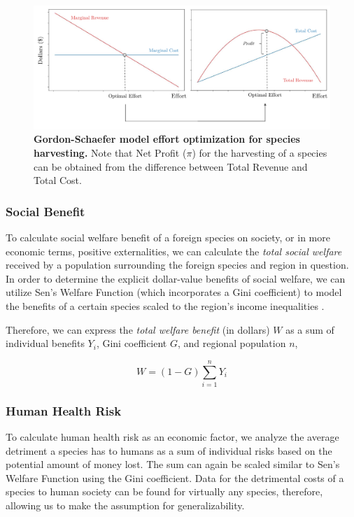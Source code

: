 \begin{figure}[h!]
\centering
    \includegraphics[scale=0.65]{figures/gordonschaefer.pdf}
    \captionsetup{width=0.9\textwidth}
    \caption{\textbf{Gordon-Schaefer model effort optimization for species harvesting.} Note that Net Profit (\(\pi\)) for the harvesting of a species can be obtained from the difference between Total Revenue and Total Cost.}
    \label{fig:gordonschafer}
\end{figure}

\subsubsection{Social Benefit}

To calculate social welfare benefit of a foreign species on society, or in more economic terms, positive externalities, we can calculate the \textit{total social welfare} received by a population surrounding the foreign species and region in question. In order to determine the explicit dollar-value benefits of social welfare, we can utilize Sen's Welfare Function (which incorporates a Gini coefficient) to model the benefits of a certain species scaled to the region's income inequalities \cite{wikipediaSocialWelfare, worldbankWorldBank}. 

Therefore, we can express the \textit{total welfare benefit} (in dollars) \(W\) as a sum of individual benefits \(Y_i\), Gini coefficient \(G\), and regional population \(n\),

\begin{equation}
    W = (1 - G) \sum_{i=1}^n Y_i
\end{equation}

\subsubsection{Human Health Risk}

To calculate human health risk as an economic factor, we analyze the average detriment a species has to humans as a sum of individual risks based on the potential amount of money lost. The sum can again be scaled similar to Sen's Welfare Function using the Gini coefficient. Data for the detrimental costs of a species to human society can be found for virtually any species, therefore, allowing us to make the assumption for generalizability.

